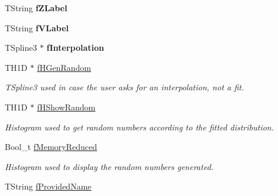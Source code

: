 \begin{DoxyCompactItemize}
\item 
\hypertarget{classTSplineFit_a363bf7a37d26de273c10855d411d3dd0}{T\-String {\bfseries f\-Z\-Label}}\label{classTSplineFit_a363bf7a37d26de273c10855d411d3dd0}

\item 
\hypertarget{classTSplineFit_a79c12343aa2d43f9bf8610cdb8667e32}{T\-String {\bfseries f\-V\-Label}}\label{classTSplineFit_a79c12343aa2d43f9bf8610cdb8667e32}

\item 
\hypertarget{classTSplineFit_a5358d22ad5cca034f60dbb18841b7daa}{T\-Spline3 $\ast$ {\bfseries f\-Interpolation}}\label{classTSplineFit_a5358d22ad5cca034f60dbb18841b7daa}

\item 
\hypertarget{classTSplineFit_afdd6aa6816aaaee17a4223c8985ec35c}{T\-H1\-D $\ast$ \hyperlink{classTSplineFit_afdd6aa6816aaaee17a4223c8985ec35c}{f\-H\-Gen\-Random}}\label{classTSplineFit_afdd6aa6816aaaee17a4223c8985ec35c}

\begin{DoxyCompactList}\small\item\em T\-Spline3 used in case the user asks for an interpolation, not a fit. \end{DoxyCompactList}\item 
\hypertarget{classTSplineFit_a06950b3b83d47f0586d5585070758338}{T\-H1\-D $\ast$ \hyperlink{classTSplineFit_a06950b3b83d47f0586d5585070758338}{f\-H\-Show\-Random}}\label{classTSplineFit_a06950b3b83d47f0586d5585070758338}

\begin{DoxyCompactList}\small\item\em Histogram used to get random numbers according to the fitted distribution. \end{DoxyCompactList}\item 
\hypertarget{classTSplineFit_af8a9f30c5273edec42b86819b52d3d1d}{Bool\-\_\-t \hyperlink{classTSplineFit_af8a9f30c5273edec42b86819b52d3d1d}{f\-Memory\-Reduced}}\label{classTSplineFit_af8a9f30c5273edec42b86819b52d3d1d}

\begin{DoxyCompactList}\small\item\em Histogram used to display the random numbers generated. \end{DoxyCompactList}\item 
\hypertarget{classTSplineFit_aef1b944aa8ae640342c71de8f2c1bc0f}{T\-String \hyperlink{classTSplineFit_aef1b944aa8ae640342c71de8f2c1bc0f}{f\-Provided\-Name}}\label{classTSplineFit_aef1b944aa8ae640342c71de8f2c1bc0f}


\end{DoxyCompactItemize}
